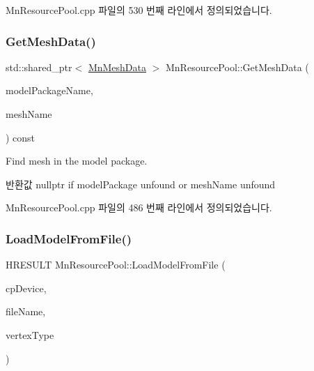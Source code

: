 Mn\+Resource\+Pool.\+cpp 파일의 530 번째 라인에서 정의되었습니다.

\mbox{\label{class_m_n_l_1_1_mn_resource_pool_aec880e1f2103fe954fd08312256af4dd}} 
\subsubsection{\texorpdfstring{Get\+Mesh\+Data()}{GetMeshData()}}
{\footnotesize\ttfamily std\+::shared\+\_\+ptr$<$ \hyperlink{class_m_n_l_1_1_mn_mesh_data}{Mn\+Mesh\+Data} $>$ Mn\+Resource\+Pool\+::\+Get\+Mesh\+Data (\begin{DoxyParamCaption}\item[{const std\+::string \&}]{model\+Package\+Name,  }\item[{const std\+::string \&}]{mesh\+Name }\end{DoxyParamCaption}) const}

Find mesh in the model package. \begin{DoxyReturn}{반환값}
nullptr if model\+Package unfound or mesh\+Name unfound 
\end{DoxyReturn}


Mn\+Resource\+Pool.\+cpp 파일의 486 번째 라인에서 정의되었습니다.

\mbox{\label{class_m_n_l_1_1_mn_resource_pool_ac41948326baafb260a2c198ee1baf387}} 
\subsubsection{\texorpdfstring{Load\+Model\+From\+File()}{LoadModelFromFile()}\hspace{0.1cm}{\footnotesize\ttfamily [1/2]}}
{\footnotesize\ttfamily H\+R\+E\+S\+U\+LT Mn\+Resource\+Pool\+::\+Load\+Model\+From\+File (\begin{DoxyParamCaption}\item[{const \hyperlink{namespace_m_n_l_a1eec210db8f309a4a9ac0d9658784c31}{C\+P\+D3\+D\+Device} \&}]{cp\+Device,  }\item[{const std\+::string \&}]{file\+Name,  }\item[{const std\+::shared\+\_\+ptr$<$ \hyperlink{class_m_n_l_1_1_mn_custom_vertex_type}{Mn\+Custom\+Vertex\+Type} $>$ \&}]{vertex\+Type }\end{DoxyParamCaption})}

